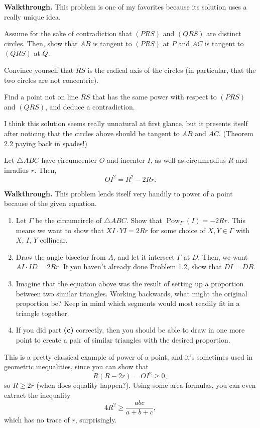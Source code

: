 \documentclass{scrartcl}
\providecommand{\ii}{\item}
\newenvironment{walkthrough}{\noindent\textbf{Walkthrough.}}{}
\providecommand{\pow}{\operatorname{Pow}}
\begin{document}
\begin{walkthrough}
	This problem is one of my favorites because its solution
	uses a really unique idea.
	\begin{walk}
		\ii Assume for the sake of contradiction that $(PRS)$ and $(QRS)$
		are distinct circles. Then, show that
		$AB$ is tangent to $(PRS)$ at $P$ and
		$AC$ is tangent to $(QRS)$ at $Q$.
		\ii Convince yourself that $RS$ is the radical axis of the circles
		(in particular, that the two circles are not concentric).
		\ii Find a point not on line $RS$ that has the same power
		with respect to $(PRS)$ and $(QRS)$, and deduce a contradiction.
	\end{walk}
	
	I think this solution seems really unnatural at first glance,
	but it presents itself after noticing that the circles above
	should be tangent to $AB$ and $AC$.
	(Theorem 2.2 paying back in spades!)
\end{walkthrough}

\begin{example}
	Let $\triangle ABC$ have circumcenter $O$ and incenter $I$,
	as well as circumradius $R$ and inradius $r$. Then,
	\[OI^2 = R^2 - 2Rr.\]
\end{example}

\begin{walkthrough}
	This problem lends itself very handily to power of a point
	because of the given equation.
	\begin{enumerate}[label=\textbf{(\alph*)}]
		\ii Let $\Gamma$ be the circumcircle of $\triangle ABC$.
		Show that $\pow_{\Gamma}(I) = -2Rr$.
		This means we want to show that $XI\cdot YI = 2Rr$
		for some choice of $X,Y\in\Gamma$ with $X$, $I$, $Y$ collinear.
		\ii Draw the angle bisector from $A$, and let it intersect $\Gamma$
		at $D$. Then, we want $AI\cdot ID = 2Rr$.
		If you haven't already done Problem 1.2, show that $DI = DB$.
		\ii Imagine that the equation above was the result of
		setting up a proportion between two similar triangles.
		Working backwards, what might the original proportion be?
		Keep in mind which segments would most readily fit in a triangle together.
		\ii If you did part \textbf{(c)} correctly, then you should be able to
		draw in one more point to create a pair of similar triangles
		with the desired proportion.
	\end{enumerate}
	
	This is a pretty classical example of power of a point, and it's
	sometimes used in geometric inequalities, since you can show that
	\[R(R - 2r) = OI^2 \ge 0,\]
	so $R \ge 2r$ (when does equality happen?). Using some area formulas,
	you can even extract the inequality
	\[4R^2 \ge \frac{abc}{a + b + c},\]
	which has no trace of $r$, surprisingly.
\end{walkthrough}
\end{document}

